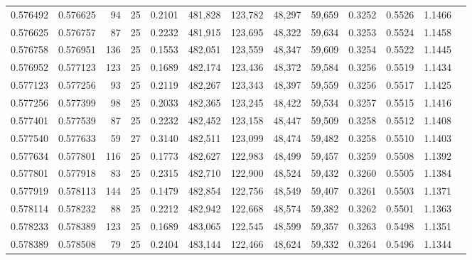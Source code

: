 \begin{tabular}{rrrrrrrrrrrrr}
0.576492 & 0.576625 &    94 &  25 &                                     0.2101 & 481,828 & 123,782 &  48,297 &  59,659 & 0.3252 & 0.5526 & 1.1466 \\
0.576625 & 0.576757 &    87 &  25 &                                     0.2232 & 481,915 & 123,695 &  48,322 &  59,634 & 0.3253 & 0.5524 & 1.1458 \\
0.576758 & 0.576951 &   136 &  25 &                                     0.1553 & 482,051 & 123,559 &  48,347 &  59,609 & 0.3254 & 0.5522 & 1.1445 \\
0.576952 & 0.577123 &   123 &  25 &                                     0.1689 & 482,174 & 123,436 &  48,372 &  59,584 & 0.3256 & 0.5519 & 1.1434 \\
0.577123 & 0.577256 &    93 &  25 &                                     0.2119 & 482,267 & 123,343 &  48,397 &  59,559 & 0.3256 & 0.5517 & 1.1425 \\
0.577256 & 0.577399 &    98 &  25 &                                     0.2033 & 482,365 & 123,245 &  48,422 &  59,534 & 0.3257 & 0.5515 & 1.1416 \\
0.577401 & 0.577539 &    87 &  25 &                                     0.2232 & 482,452 & 123,158 &  48,447 &  59,509 & 0.3258 & 0.5512 & 1.1408 \\
0.577540 & 0.577633 &    59 &  27 &                                     0.3140 & 482,511 & 123,099 &  48,474 &  59,482 & 0.3258 & 0.5510 & 1.1403 \\
0.577634 & 0.577801 &   116 &  25 &                                     0.1773 & 482,627 & 122,983 &  48,499 &  59,457 & 0.3259 & 0.5508 & 1.1392 \\
0.577801 & 0.577918 &    83 &  25 &                                     0.2315 & 482,710 & 122,900 &  48,524 &  59,432 & 0.3260 & 0.5505 & 1.1384 \\
0.577919 & 0.578113 &   144 &  25 &                                     0.1479 & 482,854 & 122,756 &  48,549 &  59,407 & 0.3261 & 0.5503 & 1.1371 \\
0.578114 & 0.578232 &    88 &  25 &                                     0.2212 & 482,942 & 122,668 &  48,574 &  59,382 & 0.3262 & 0.5501 & 1.1363 \\
0.578233 & 0.578389 &   123 &  25 &                                     0.1689 & 483,065 & 122,545 &  48,599 &  59,357 & 0.3263 & 0.5498 & 1.1351 \\
0.578389 & 0.578508 &    79 &  25 &                                     0.2404 & 483,144 & 122,466 &  48,624 &  59,332 & 0.3264 & 0.5496 & 1.1344 \\

\end{tabular}
